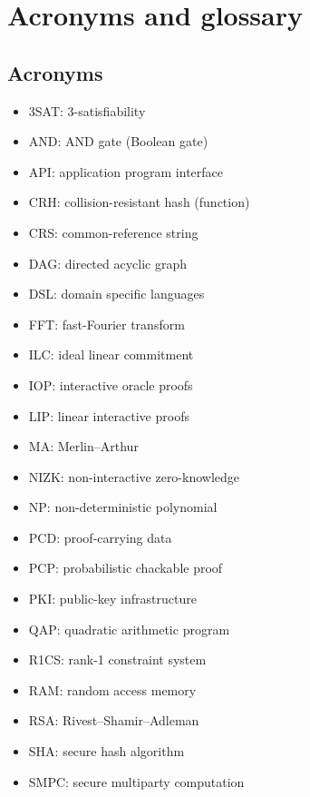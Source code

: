 \appendix
{}\chapter{Acronyms and glossary} 
\label{security:abbreviations}


\section{Acronyms}
\label{app:acronyms}


\begin{multicols}{2}\small
\begin{itemize}
\item 3SAT: 3-satisfiability
\item AND: AND gate (Boolean gate)
\item API: application program interface
\item CRH: collision-resistant hash (function)
\item CRS: common-reference string
\item DAG: directed acyclic graph
\item DSL: domain specific languages
\item FFT: fast-Fourier transform
\item ILC: ideal linear commitment
\item IOP: interactive oracle proofs
\item LIP: linear interactive proofs
\item MA: Merlin--Arthur
\item NIZK: non-interactive zero-knowledge
\item NP: non-deterministic polynomial
\item PCD: proof-carrying data
\item PCP: probabilistic chackable proof
\item PKI: public-key infrastructure
\item QAP: quadratic arithmetic program
\item R1CS: rank-1 constraint system
\item RAM: random access memory 
\item RSA: Rivest--Shamir--Adleman
\item SHA: secure hash algorithm
\item SMPC: secure multiparty computation

\end{itemize}
\end{multicols}
